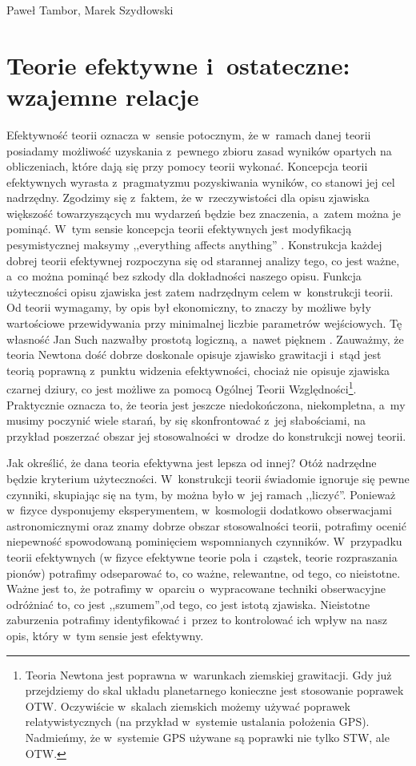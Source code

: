 \begin{artplenv}{Paweł Tambor, Marek Szydłowski}
\section{Teorie efektywne i~ostateczne: wzajemne relacje}
Efektywność teorii oznacza w~sensie potocznym, że w~ramach danej teorii posiadamy możliwość uzyskania z~pewnego zbioru zasad wyników opartych na obliczeniach, które dają się przy pomocy teorii wykonać. Koncepcja teorii efektywnych wyrasta z~pragmatyzmu pozyskiwania wyników, co stanowi jej cel nadrzędny. Zgodzimy się z~faktem, że w~rzeczywistości dla opisu zjawiska większość towarzyszących mu wydarzeń będzie bez znaczenia, a~zatem można je pominąć. W~tym sensie koncepcja teorii efektywnych jest modyfikacją pesymistycznej maksymy ,,everything affects anything''
\parencite[][s.~1]{wells_effective_2012}. %
 Konstrukcja każdej dobrej teorii efektywnej rozpoczyna się od starannej analizy tego, co jest ważne, a~co można pominąć bez szkody dla dokładności naszego opisu. Funkcja użyteczności opisu zjawiska jest zatem nadrzędnym celem w~konstrukcji teorii. Od teorii wymagamy, by opis był ekonomiczny, to znaczy by możliwe były wartościowe przewidywania przy minimalnej liczbie parametrów wejściowych. Tę własność Jan Such nazwałby prostotą logiczną, a~nawet pięknem 
\parencites[por.][s.~45]{such_czy_1975}[zob. także][s.~45]{such_na_2014}. %
 Zauważmy, że teoria Newtona dość dobrze doskonale opisuje zjawisko grawitacji i~stąd jest teorią poprawną z~punktu widzenia efektywności, chociaż nie opisuje zjawiska czarnej dziury, co jest możliwe za pomocą Ogólnej Teorii Względności\footnote{Teoria Newtona jest poprawna w~warunkach ziemskiej grawitacji. Gdy już przejdziemy do skal układu planetarnego konieczne jest stosowanie poprawek OTW. Oczywiście w~skalach ziemskich możemy używać poprawek relatywistycznych (na przykład w~systemie ustalania położenia GPS). Nadmieńmy, że w~systemie GPS używane są poprawki nie tylko STW, ale OTW.}. Praktycznie oznacza to, że teoria jest jeszcze niedokończona, niekompletna, a~my musimy poczynić wiele starań, by się skonfrontować z~jej słabościami, na przykład poszerzać obszar jej stosowalności w~drodze do konstrukcji nowej teorii.

Jak określić, że dana teoria efektywna jest lepsza od innej? Otóż nadrzędne będzie kryterium użyteczności. W~konstrukcji teorii świadomie ignoruje się pewne czynniki, skupiając się na tym, by można było w~jej ramach ,,liczyć''. Ponieważ w~fizyce dysponujemy eksperymentem, w~kosmologii dodatkowo obserwacjami astronomicznymi oraz znamy dobrze obszar stosowalności teorii, potrafimy ocenić niepewność spowodowaną pominięciem wspomnianych czynników. W~przypadku teorii efektywnych (w fizyce efektywne teorie pola i~cząstek, teorie rozpraszania pionów) potrafimy odseparować to, co ważne, relewantne, od tego, co nieistotne. Ważne jest to, że potrafimy w~oparciu o~wypracowane techniki obserwacyjne odróżniać to, co jest ,,szumem'',od tego, co jest istotą zjawiska. Nieistotne zaburzenia potrafimy identyfikować i~przez to kontrolować ich wpływ na nasz opis, który w~tym sensie jest efektywny.


\end{artplenv}
